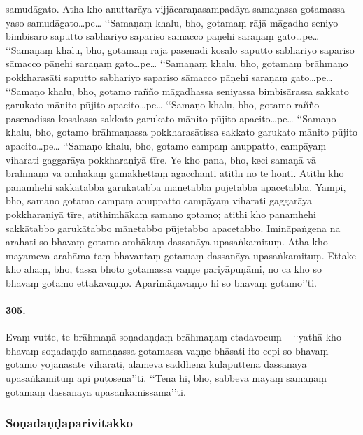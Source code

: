 samudāgato. Atha kho anuttarāya vijjācaraṇasampadāya samaṇassa gotamassa yaso samudāgato…pe… ‘‘Samaṇaṃ khalu, bho, gotamaṃ rājā māgadho seniyo bimbisāro saputto sabhariyo sapariso sāmacco pāṇehi saraṇaṃ gato…pe… ‘‘Samaṇaṃ khalu, bho, gotamaṃ rājā pasenadi kosalo saputto sabhariyo sapariso sāmacco pāṇehi saraṇaṃ gato…pe… ‘‘Samaṇaṃ khalu, bho, gotamaṃ brāhmaṇo pokkharasāti saputto sabhariyo sapariso sāmacco pāṇehi saraṇaṃ gato…pe… ‘‘Samaṇo khalu, bho, gotamo rañño māgadhassa seniyassa bimbisārassa sakkato garukato mānito pūjito apacito…pe… ‘‘Samaṇo khalu, bho, gotamo rañño pasenadissa kosalassa sakkato garukato mānito pūjito apacito…pe… ‘‘Samaṇo khalu, bho, gotamo brāhmaṇassa pokkharasātissa sakkato garukato mānito pūjito apacito…pe… ‘‘Samaṇo khalu, bho, gotamo campaṃ anuppatto, campāyaṃ viharati gaggarāya pokkharaṇiyā tīre. Ye kho pana, bho, keci samaṇā vā brāhmaṇā vā amhākaṃ gāmakhettaṃ āgacchanti atithī no te honti. Atithī kho panamhehi sakkātabbā garukātabbā mānetabbā pūjetabbā apacetabbā. Yampi, bho, samaṇo gotamo campaṃ anuppatto campāyaṃ viharati gaggarāya pokkharaṇiyā tīre, atithimhākaṃ samaṇo gotamo; atithi kho panamhehi sakkātabbo garukātabbo mānetabbo pūjetabbo apacetabbo. Imināpaṅgena na arahati so bhavaṃ gotamo amhākaṃ dassanāya upasaṅkamituṃ. Atha kho mayameva arahāma taṃ bhavantaṃ gotamaṃ dassanāya upasaṅkamituṃ. Ettake kho ahaṃ, bho, tassa bhoto gotamassa vaṇṇe pariyāpuṇāmi, no ca kho so bhavaṃ gotamo ettakavaṇṇo. Aparimāṇavaṇṇo hi so bhavaṃ gotamo’’ti.

\paragraph{305.} Evaṃ vutte, te brāhmaṇā soṇadaṇḍaṃ brāhmaṇaṃ etadavocuṃ – ‘‘yathā kho bhavaṃ soṇadaṇḍo samaṇassa gotamassa vaṇṇe bhāsati ito cepi so bhavaṃ gotamo yojanasate viharati, alameva saddhena kulaputtena dassanāya upasaṅkamituṃ api puṭosenā’’ti. ‘‘Tena hi, bho, sabbeva mayaṃ samaṇaṃ gotamaṃ dassanāya upasaṅkamissāmā’’ti.

\subsubsection{Soṇadaṇḍaparivitakko}


